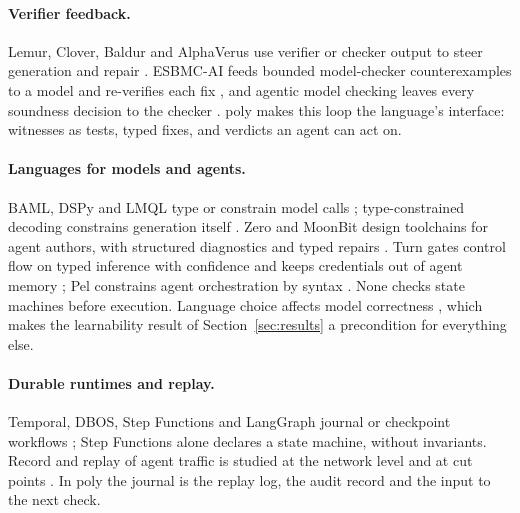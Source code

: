\documentclass[11pt]{article}
\newcommand{\poly}{\textsf{poly}}
\begin{document}
\paragraph{Verifier feedback.} Lemur, Clover, Baldur and AlphaVerus use verifier or checker output to steer generation and repair \cite{wu2024lemur,sun2023clover,first2023baldur,aggarwal2024alphaverus}. ESBMC-AI feeds bounded model-checker counterexamples to a model and re-verifies each fix \cite{tihanyi2023esbmcai}, and agentic model checking leaves every soundness decision to the checker \cite{sun2026agenticmc}. \poly{} makes this loop the language's interface: witnesses as tests, typed fixes, and verdicts an agent can act on.

\paragraph{Languages for models and agents.} BAML, DSPy and LMQL type or constrain model calls \cite{bamlweb,khattab2024dspy,beurerkellner2023lmql}; type-constrained decoding constrains generation itself \cite{mundler2025typeconstrained}. Zero and MoonBit design toolchains for agent authors, with structured diagnostics and typed repairs \cite{zero2026,moonbit}. Turn gates control flow on typed inference with confidence and keeps credentials out of agent memory \cite{kizito2026turn}; Pel constrains agent orchestration by syntax \cite{mohammadi2025pel}. None checks state machines before execution. Language choice affects model correctness \cite{cassano2023multiple,cassano2024multiplt,twist2026preferences}, which makes the learnability result of Section~\ref{sec:results} a precondition for everything else.

\paragraph{Durable runtimes and replay.} Temporal, DBOS, Step Functions and LangGraph journal or checkpoint workflows \cite{temporal,dbos,stepfunctions,langgraph}; Step Functions alone declares a state machine, without invariants. Record and replay of agent traffic is studied at the network level and at cut points \cite{chen2015replay,mudasiru2026agrepl,chawla2026chronicle}. In \poly{} the journal is the replay log, the audit record and the input to the next check.
\end{document}
